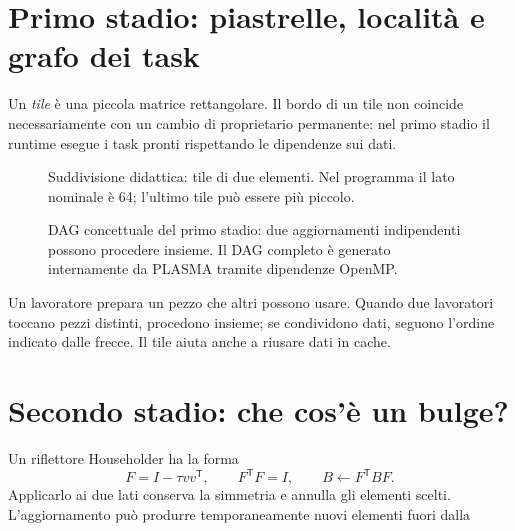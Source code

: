 \documentclass[11pt,a4paper]{article}
\newcommand{\semplice}[1]{\begin{idea}[title=In parole semplici]#1\end{idea}}
\newcommand{\T}{\mathsf{T}}
\newcommand{\page}[1]{\clearpage\section{#1}}
\begin{document}
\page{Primo stadio: piastrelle, località e grafo dei task}
Un \emph{tile} è una piccola matrice rettangolare. Il bordo di un tile non
coincide necessariamente con un cambio di proprietario permanente: nel primo
stadio il runtime esegue i task pronti rispettando le dipendenze sui dati.
\begin{figure}[H]\centering
{}
\caption{Suddivisione didattica: tile di due elementi. Nel programma il lato nominale è 64; l'ultimo tile può essere più piccolo.}
\end{figure}
\begin{figure}[H]\centering
{}
\caption{DAG concettuale del primo stadio: due aggiornamenti indipendenti possono procedere insieme. Il DAG completo è generato internamente da PLASMA tramite dipendenze OpenMP.}
\end{figure}
\semplice{Un lavoratore prepara un pezzo che altri possono usare. Quando due
lavoratori toccano pezzi distinti, procedono insieme; se condividono dati,
seguono l'ordine indicato dalle frecce. Il tile aiuta anche a riusare dati in cache.}
\page{Secondo stadio: che cos'è un bulge?}
Un riflettore Householder ha la forma
\[
F=I-\tau vv^{\T},\qquad F^{\T}F=I,
\qquad B\leftarrow F^{\T}BF.
\]
Applicarlo ai due lati conserva la simmetria e annulla gli elementi scelti.
L'aggiornamento può produrre temporaneamente nuovi elementi fuori dalla
\end{document}
